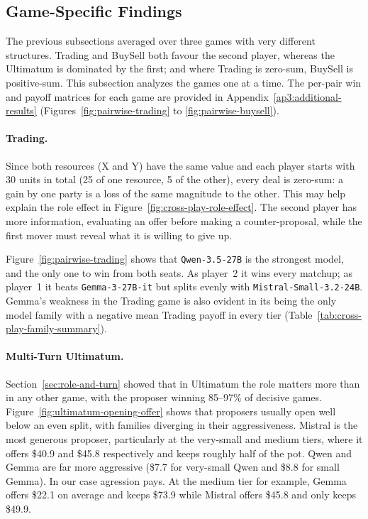 \subsection{Game-Specific Findings}



The previous subsections averaged over three games with very different structures. Trading and BuySell both favour the second player, whereas the Ultimatum is dominated by the first; and where Trading is zero-sum, BuySell is positive-sum. This subsection analyzes the games one at a time. The per-pair win and payoff matrices for each game are provided in Appendix~\ref{ap3:additional-results} (Figures~\ref{fig:pairwise-trading} to \ref{fig:pairwise-buysell}).

\paragraph{Trading.}

Since both resources (X and Y) have the same value and each player starts with 30 units in total (25 of one resource, 5 of the other), every deal is zero-sum: a gain by one party is a loss of the same magnitude to the other. This may help explain the role effect in Figure~\ref{fig:cross-play-role-effect}. The second player has more information, evaluating an offer before making a counter-proposal, while the first mover must reveal what it is willing to give up.

Figure~\ref{fig:pairwise-trading} shows that \texttt{Qwen-3.5-27B} is the strongest model, and the only one to win from both seats. As player~2 it wins every matchup; as player~1 it beats \texttt{Gemma-3-27B-it} but splits evenly with \texttt{Mistral-Small-3.2-24B}. Gemma's weakness in the Trading game is also evident in its being the only model family with a negative mean Trading payoff in every tier (Table~\ref{tab:cross-play-family-summary}).

\paragraph{Multi-Turn Ultimatum.}

Section~\ref{sec:role-and-turn} showed that in Ultimatum the role matters more than in any other game, with the proposer winning 85--97\% of decisive games. Figure~\ref{fig:ultimatum-opening-offer} shows that proposers usually open well below an even split, with families diverging in their aggressiveness. Mistral is the most generous proposer, particularly at the very-small and medium tiers, where it offers \$40.9 and \$45.8 respectively and keeps roughly half of the pot. Qwen and Gemma are far more aggressive (\$7.7 for very-small Qwen and \$8.8 for small Gemma). In our case agression pays. At the medium tier for example, Gemma offers \$22.1 on average and keeps \$73.9 while Mistral offers \$45.8 and only keeps \$49.9.

